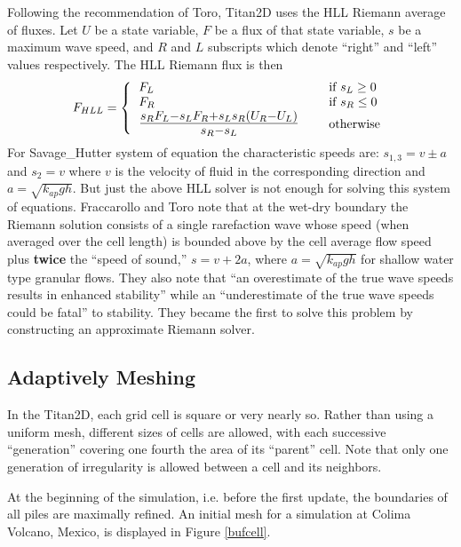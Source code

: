 \documentclass[letterpaper,10pt]{article}
\begin{document}
Following the recommendation of Toro\cite{ToroBook2001}, Titan2D uses 
the HLL Riemann average of fluxes. Let $U$ be a state variable, $F$ 
be a flux of that state variable, $s$ be a maximum wave speed, 
and $R$ and $L$ subscripts which denote ``right'' and ``left'' values 
respectively.  The HLL Riemann flux is then
\begin{equation}
F_{HLL}=\left\{\begin{tabular}{lll}$F_L$&\hspace{0.5 truein}& if $s_L\ge 0$\\$F_R$&& if $s_R\le 0$\\{\Large 
$\frac{s_RF_L-s_LF_R+s_Ls_R(U_R-U_L)}{s_R-s_L}$}&& otherwise\end{tabular} \right.
\end{equation}
For Savage\_Hutter system of equation the characteristic speeds are: $s_{1,3}=v\pm a$ and $s_2=v$ where $v$ is the 
velocity of fluid in the corresponding direction and $a=\sqrt{k_{ap}gh}$.
But just the above HLL solver is not enough for solving this system of equations.
Fraccarollo and Toro\cite{FraccarolloToro1995} note that at the 
wet-dry boundary the Riemann solution consists of a single rarefaction 
wave whose speed (when averaged over the cell length) 
is bounded above by the cell average flow speed plus 
{\bf twice} the ``speed of sound,'' $s=v+2a$, where $a=\sqrt{k_{ap}gh}$ 
for shallow water type granular flows.  They also note that ``an overestimate 
of the true wave speeds results in enhanced stability'' while an 
``underestimate of the true wave speeds could be fatal'' to stability.
They became the first to 
solve this problem by constructing an approximate Riemann solver.\newline

\subsection{Adaptively Meshing} \label{adaptivemeshing}
In the Titan2D, each grid cell is square or very nearly so.  Rather than 
using a uniform mesh, different sizes of cells are allowed, with each 
successive ``generation'' covering one fourth the area of its ``parent'' 
cell.  Note that only one generation of irregularity is allowed between 
a cell and its neighbors.\newline

At the beginning of the simulation, i.e. before the first update, the 
boundaries of all piles are maximally refined. An initial mesh for a 
simulation at Colima Volcano, Mexico, is displayed in Figure \ref{bufcell}. 
\end{document}
